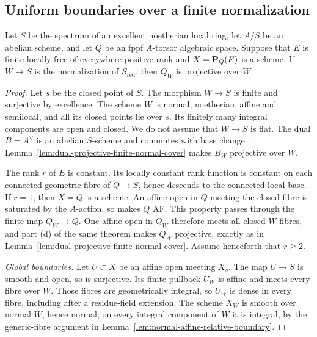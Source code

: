 \subsection{Uniform boundaries over a finite normalization}

\begin{proposition}\label{prop:torsor-projective-after-normalization}
Let $S$ be the spectrum of an excellent noetherian local ring,
let $A/S$ be an abelian scheme, and let $Q$ be an fppf $A$-torsor
algebraic space. Suppose that $E$ is finite locally free of
everywhere positive rank and $X=\mathbf P_Q(E)$ is a scheme. If
$W\to S$ is the normalization of $S_{\mathrm{red}}$, then
$Q_W$ is projective over $W$.
\end{proposition}

\begin{proof}
Let $s$ be the closed point of $S$. The morphism $W\to S$ is
finite and surjective by excellence. The scheme $W$ is normal,
noetherian, affine and semilocal, and all its closed points lie
over $s$. Its finitely many integral components are open and
closed. We do not assume that $W\to S$ is flat.
The dual $B=A^\vee$ is an abelian $S$-scheme and commutes with
base change \cite[\S3.1]{PR}\cite[Corollary~4.6]{LaurentSchroer}.
Lemma~\ref{lem:dual-projective-finite-normal-cover} makes $B_W$
projective over $W$.

The rank $r$ of $E$ is constant. Its locally constant rank
function is constant on each connected geometric fibre of
$Q\to S$, hence descends to the connected local base.
If $r=1$, then $X=Q$ is a scheme. An affine open in $Q$ meeting
the closed fibre is saturated by the $A$-action, so
\cite[6.6, Theorem~2(c)]{BLR} makes $Q$ AF. This property passes
through the finite map $Q_W\to Q$. One affine open in $Q_W$
therefore meets all closed $W$-fibres, and part (d) of the same
theorem makes $Q_W$ projective, exactly as in
Lemma~\ref{lem:dual-projective-finite-normal-cover}.
Assume henceforth that $r\geq2$.

\emph{Global boundaries.}
Let $U\subset X$ be an affine open meeting $X_s$. The map
$U\to S$ is smooth and open, so is surjective. Its finite
pullback $U_W$ is affine and meets every fibre over $W$.
Those fibres are geometrically integral, so $U_W$ is dense
in every fibre, including after a residue-field extension.
The scheme $X_W$ is smooth over normal $W$, hence normal;
on every integral component of $W$ it is integral, by the
generic-fibre argument in
Lemma~\ref{lem:normal-affine-relative-boundary}.


\end{proof}
